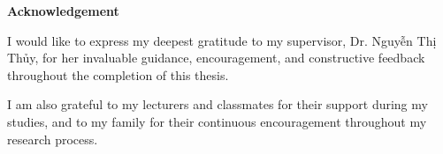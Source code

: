 {}
\begin{center}
\textbf{\large{Acknowledgement}}
\end{center}

I would like to express my deepest gratitude to my supervisor, Dr. Nguyễn Thị Thủy, for her invaluable guidance, encouragement, and constructive feedback throughout the completion of this thesis.

I am also grateful to my lecturers and classmates for their support during my studies, and to my family for their continuous encouragement throughout my research process.
